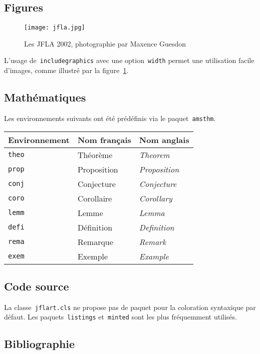 \documentclass[draft]{jflart}
\begin{document}
\subsection{Figures}

\begin{figure}
  \centering
  \texttt{[image: jfla.jpg]}
  \caption{Les JFLA 2002, photographie par Maxence Guesdon}
  \label{fig:bienbelle}
\end{figure}

L'usage de~\texttt{includegraphics} avec une option~\texttt{width} permet une
utilisation facile d'images, comme illustré par la figure~\ref{fig:bienbelle}.

\subsection{Mathématiques}

Les environnements suivants ont été prédéfinis via le paquet~\texttt{amsthm}.

\begin{center}
  \begin{tabular}{lll}
    Environnement & Nom français & Nom anglais
    \\
    \hline
    \texttt{theo} & Théorème & \emph{Theorem}
    \\
    \texttt{prop} & Proposition & \emph{Proposition}
    \\
    \texttt{conj} & Conjecture & \emph{Conjecture}
    \\
    \texttt{coro} & Corollaire & \emph{Corollary}
    \\
    \texttt{lemm} & Lemme & \emph{Lemma}
    \\
    \texttt{defi} & Définition & \emph{Definition}
    \\
    \texttt{rema} & Remarque & \emph{Remark}
    \\
    \texttt{exem} & Exemple & \emph{Example}
  \end{tabular}
\end{center}

\subsection{Code source}

La classe~\texttt{jflart.cls} ne propose pas de paquet pour la coloration
syntaxique par défaut.
%
Les paquets~\texttt{listings} et~\texttt{minted} sont les plus fréquemment
utilisés.

\subsection{Bibliographie}
\end{document}
